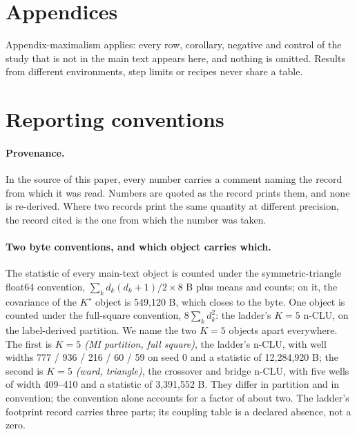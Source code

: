 \documentclass{article} %
\newcommand{\Kstar}{\ensuremath{K^{\star}}}
\begin{document}

\clearpage
\appendix
\section*{Appendices}
Appendix-maximalism applies: every row, corollary, negative and control of the study that is
not in the main text appears here, and nothing is omitted. Results from different
environments, step limits or recipes never share a table.

\section{Reporting conventions}
\label{app:conventions}

\paragraph{Provenance.} In the source of this paper, every number carries a comment naming the
record from which it was read. Numbers are quoted as the record prints them, and none is
re-derived. Where two records print the same quantity at different precision, the record
cited is the one from which the number was taken.

\paragraph{Two byte conventions, and which object carries which.} The statistic of every
main-text object is counted under the symmetric-triangle float64 convention,
$\sum_k d_k(d_k+1)/2\times8$ B plus means and counts; on it, the covariance of the $\Kstar$
object is 549,120 B, which closes to the byte. %
One object is counted under the full-square convention, $8\sum_k d_k^2$: the ladder's $K=5$ n-CLU,
on the label-derived partition. We name the two $K=5$ objects apart everywhere. The first is
\emph{$K=5$ (MI partition, full square)}, the ladder's n-CLU, with well widths 777 / 936 / 216 / 60 /
59 on seed 0 and a statistic of 12,284,920 B; the second is \emph{$K=5$ (ward, triangle)}, the
crossover and bridge n-CLU, with five wells of width 409--410 and a statistic of 3,391,552 B.
They differ in partition and in convention; the convention alone accounts for a factor of about two.
The ladder's footprint record carries three parts; its coupling table is a declared absence, not a
zero. %
\end{document}

